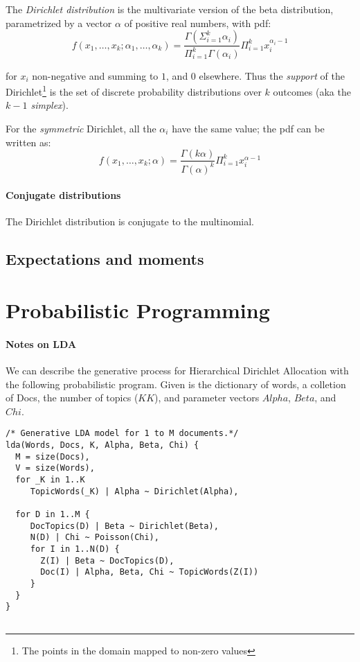 \documentclass{article}
\theoremstyle{definition}
\begin{document}
The {\em Dirichlet distribution} is the multivariate version of the beta distribution, parametrized by a vector \(\alpha\) of positive real numbers, with pdf:
\[f(x_1, \ldots, x_k; \alpha_1, \ldots, \alpha_k)
  = \frac{\Gamma(\Sigma_{i=1}^k \alpha_i)}{\Pi_{i=1}^k \Gamma(\alpha_i)} \Pi_{i=1}^k x_i^{\alpha_i -1}\]

for \(x_i\) non-negative and summing to \(1\), and \(0\) elsewhere. Thus the {\em support} of the Dirichlet\footnote{The points in the domain mapped to non-zero values} is the set of discrete probability distributions over \(k\) outcomes (aka the {\em \(k-1\) simplex}).

For the {\em symmetric} Dirichlet, all the \(\alpha_i\) have the same value; the pdf can be written as:
\[f(x_1, \ldots, x_k; \alpha) = \frac{\Gamma(k\alpha)}{\Gamma(\alpha)^k} \Pi_{i=1}^k x_i^{\alpha -1}\]

\paragraph{Conjugate distributions}

The Dirichlet distribution is conjugate to the multinomial.

\subsection{Expectations and moments}

\section{Probabilistic Programming}
\paragraph{Notes on LDA}

We can describe the generative process for Hierarchical Dirichlet Allocation with the following probabilistic program. Given is the dictionary of words, a colletion of Docs, the number of topics (\(KK\)), and parameter vectors \(Alpha\), \(Beta\), and \(Chi\).  

\begin{lstlisting}
/* Generative LDA model for 1 to M documents.*/
lda(Words, Docs, K, Alpha, Beta, Chi) {
  M = size(Docs),
  V = size(Words),
  for _K in 1..K
     TopicWords(_K) | Alpha ~ Dirichlet(Alpha),

  for D in 1..M {
     DocTopics(D) | Beta ~ Dirichlet(Beta),
     N(D) | Chi ~ Poisson(Chi),
     for I in 1..N(D) {
       Z(I) | Beta ~ DocTopics(D),
       Doc(I) | Alpha, Beta, Chi ~ TopicWords(Z(I))
     }
  }
}
  
\end{lstlisting}
\end{document}

